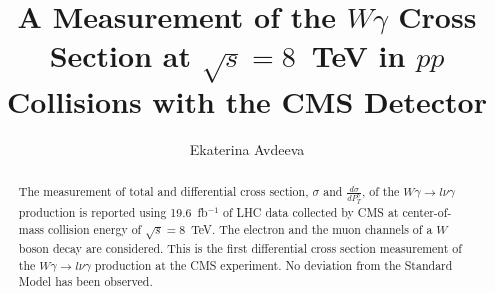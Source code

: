 \documentclass[print]{nuthesis}
\begin{document}
\frontmatter
\title{A Measurement of the $W\gamma$ Cross Section at $\sqrt{s}=8$~TeV in $pp$ Collisions with the CMS Detector}
\author{Ekaterina Avdeeva}
\maketitle
\begin{abstract}
The measurement of total and differential cross section,  $\sigma$ and $\frac{d\sigma}{dP_T^{\gamma}}$, of the $W\gamma\rightarrow l\nu\gamma$ production is reported using 19.6~fb$^{-1}$ of LHC data collected by CMS at center-of-mass collision energy of $\sqrt{s}=8$~TeV. The electron and the muon channels of a $W$ boson decay are considered. This is the first  differential cross section measurement of the $W\gamma\rightarrow l\nu\gamma$ production at the CMS experiment. No deviation from the Standard Model has been observed.
% 
\end{abstract}





\end{document}
